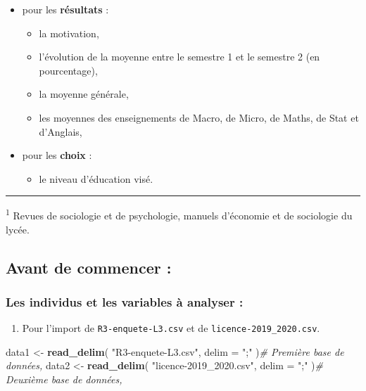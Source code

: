 \documentclass[
  11pt,
  french,
]{article}
\newenvironment{Shaded}{\begin{snugshade}}{\end{snugshade}}
\newcommand{\CommentTok}[1]{\textcolor[rgb]{0.56,0.35,0.01}{\textit{#1}}}
\newcommand{\DataTypeTok}[1]{\textcolor[rgb]{0.13,0.29,0.53}{#1}}
\newcommand{\KeywordTok}[1]{\textcolor[rgb]{0.13,0.29,0.53}{\textbf{#1}}}
\newcommand{\NormalTok}[1]{#1}
\newcommand{\StringTok}[1]{\textcolor[rgb]{0.31,0.60,0.02}{#1}}
\providecommand{\tightlist}{%
  \setlength{\itemsep}{0pt}\setlength{\parskip}{0pt}}
\begin{document}
\begin{itemize}
\tightlist
\item
  pour les \textbf{résultats} :

  \begin{itemize}
  \tightlist
  \item
    la motivation,
  \item
    l'évolution de la moyenne entre le semestre 1 et le semestre 2 (en
    pourcentage),
  \item
    la moyenne générale,
  \item
    les moyennes des enseignements de Macro, de Micro, de Maths, de Stat
    et d'Anglais,
  \end{itemize}
\item
  pour les \textbf{choix} :

  \begin{itemize}
  \tightlist
  \item
    le niveau d'éducation visé.
  \end{itemize}
\end{itemize}

\begin{center}\rule{0.5\linewidth}{0.5pt}\end{center}

\textsuperscript{1} Revues de sociologie et de psychologie, manuels
d'économie et de sociologie du lycée.

\hypertarget{avant-de-commencer}{%
\subsection{Avant de commencer :}\label{avant-de-commencer}}

\hypertarget{les-individus-et-les-variables-uxe0-analyser}{%
\subsubsection{Les individus et les variables à analyser
:}\label{les-individus-et-les-variables-uxe0-analyser}}

\begin{enumerate}
\def\labelenumi{\arabic{enumi}.}
\tightlist
\item
  Pour l'import de \texttt{R3-enquete-L3.csv} et de
  \texttt{licence-2019\_2020.csv}.
\end{enumerate}

\begin{Shaded}
\begin{Highlighting}[]
\NormalTok{data1 <-}\StringTok{ }\KeywordTok{read_delim}\NormalTok{( }\StringTok{"R3-enquete-L3.csv"}\NormalTok{,}
                     \DataTypeTok{delim =} \StringTok{";"}\NormalTok{ )}\CommentTok{# Première base de données,}
\NormalTok{data2 <-}\StringTok{ }\KeywordTok{read_delim}\NormalTok{( }\StringTok{"licence-2019_2020.csv"}\NormalTok{,}
                     \DataTypeTok{delim =} \StringTok{";"}\NormalTok{ )}\CommentTok{# Deuxième base de données,}
\end{Highlighting}
\end{Shaded}
\end{document}
